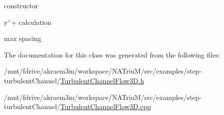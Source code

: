 constructor 

y$^\wedge$+ calculation

max spacing 

The documentation for this class was generated from the following files:\begin{DoxyCompactItemize}
\item 
/mnt/fdrive/akraem3m/workspace/NATriuM/src/examples/step-\/turbulentChannel/\hyperlink{TurbulentChannelFlow3D_8h}{TurbulentChannelFlow3D.h}\item 
/mnt/fdrive/akraem3m/workspace/NATriuM/src/examples/step-\/turbulentChannel/\hyperlink{TurbulentChannelFlow3D_8cpp}{TurbulentChannelFlow3D.cpp}\end{DoxyCompactItemize}
